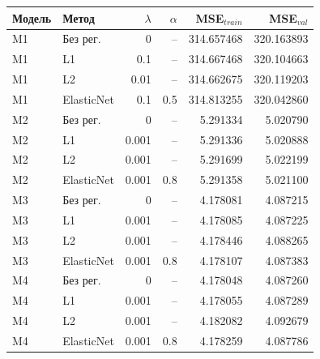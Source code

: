 \begin{tabular}{llrrrr}
\toprule
Модель & Метод & $\lambda$ & $\alpha$ & MSE$_{train}$ & MSE$_{val}$ \\
\midrule
M1 & Без рег. & 0 & -- & 314.657468 & 320.163893 \\
M1 & L1 & 0.1 & -- & 314.667468 & 320.104663 \\
M1 & L2 & 0.01 & -- & 314.662675 & 320.119203 \\
M1 & ElasticNet & 0.1 & 0.5 & 314.813255 & 320.042860 \\
M2 & Без рег. & 0 & -- & 5.291334 & 5.020790 \\
M2 & L1 & 0.001 & -- & 5.291336 & 5.020888 \\
M2 & L2 & 0.001 & -- & 5.291699 & 5.022199 \\
M2 & ElasticNet & 0.001 & 0.8 & 5.291358 & 5.021100 \\
M3 & Без рег. & 0 & -- & 4.178081 & 4.087215 \\
M3 & L1 & 0.001 & -- & 4.178085 & 4.087225 \\
M3 & L2 & 0.001 & -- & 4.178446 & 4.088265 \\
M3 & ElasticNet & 0.001 & 0.8 & 4.178107 & 4.087383 \\
M4 & Без рег. & 0 & -- & 4.178048 & 4.087260 \\
M4 & L1 & 0.001 & -- & 4.178055 & 4.087289 \\
M4 & L2 & 0.001 & -- & 4.182082 & 4.092679 \\
M4 & ElasticNet & 0.001 & 0.8 & 4.178259 & 4.087786 \\
\bottomrule
\end{tabular}
